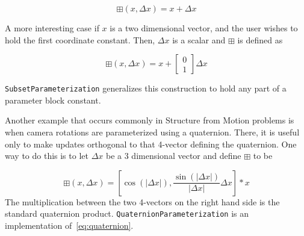 \begin{equation}
  \boxplus(x, \Delta x) = x + \Delta x
\end{equation}

A more interesting case if $x$ is a two dimensional vector, and the
user wishes to hold the first coordinate constant. Then, $\Delta x$ is a
scalar and $\boxplus$ is defined as

\begin{equation}
  \boxplus(x, \Delta x) = x + \left[ \begin{array}{c} 0 \\ 1
                                  \end{array} \right]        \Delta x
\end{equation}

\texttt{SubsetParameterization} generalizes this construction to hold any part of a parameter block constant.


Another example that occurs commonly in Structure from Motion problems
is when camera rotations are parameterized using a quaternion. There,
it is useful only to make updates orthogonal to that 4-vector defining
the quaternion. One way to do this is to let $\Delta x$ be a 3
dimensional vector and define $\boxplus$ to be

\begin{equation}
  \boxplus(x, \Delta x) =
\left[
\cos(|\Delta x|), \frac{\sin\left(|\Delta x|\right)}{|\Delta x|} \Delta x
\right] * x
\label{eq:quaternion}
\end{equation}
The multiplication between the two 4-vectors on the right hand
side is the standard quaternion product. \texttt{QuaternionParameterization} is an implementation of~\eqref{eq:quaternion}.

\clearpage

